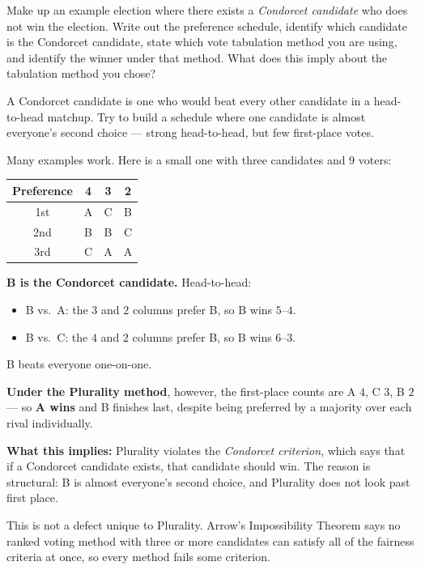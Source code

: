 \documentclass[12pt]{ximera}
\begin{document}
\begin{problem}
Make up an example election where there exists a \emph{Condorcet candidate} who does
not win the election. Write out the preference schedule, identify which candidate is
the Condorcet candidate, state which vote tabulation method you are using, and
identify the winner under that method. What does this imply about the tabulation
method you chose?

\begin{freeResponse}
\end{freeResponse}

\begin{hint}
A Condorcet candidate is one who would beat every other candidate in a head-to-head
matchup. Try to build a schedule where one candidate is almost everyone's second
choice --- strong head-to-head, but few first-place votes.
\end{hint}

\begin{feedback}
Many examples work. Here is a small one with three candidates and $9$ voters:

\begin{center}
\begin{tabular}{c|ccc}
Preference & 4 & 3 & 2 \\\hline
1st & A & C & B \\
2nd & B & B & C \\
3rd & C & A & A
\end{tabular}
\end{center}

\textbf{B is the Condorcet candidate.} Head-to-head:
\begin{itemize}
\item B vs.\ A: the $3$ and $2$ columns prefer B, so B wins $5$--$4$.
\item B vs.\ C: the $4$ and $2$ columns prefer B, so B wins $6$--$3$.
\end{itemize}
B beats everyone one-on-one.

\textbf{Under the Plurality method}, however, the first-place counts are A $4$,
C $3$, B $2$ --- so \textbf{A wins} and B finishes last, despite being preferred by a
majority over each rival individually.

\textbf{What this implies:} Plurality violates the \emph{Condorcet criterion}, which
says that if a Condorcet candidate exists, that candidate should win. The reason is
structural: B is almost everyone's second choice, and Plurality does not look past
first place.

This is not a defect unique to Plurality. Arrow's Impossibility Theorem says no ranked
voting method with three or more candidates can satisfy all of the fairness criteria
at once, so every method fails some criterion.
\end{feedback}
\end{problem}
\end{document}
